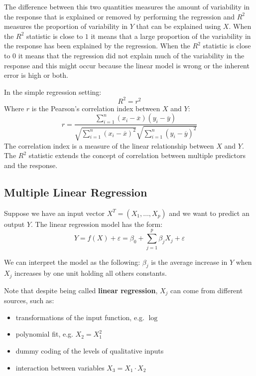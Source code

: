 The difference between this two quantities measures the amount of variability in the response that is explained or removed by performing the regression and $R^2$ measures the proportion of variability in $Y$ that can be explained using $X$.
When the $R^2$ statistic is close to $1$ it means that a large proportion of the variability in the response has been explained by the regression.
When the $R^2$ statistic is close to $0$ it means that the regression did not explain much of the variability in the response and this might occur because the linear model is wrong or the inherent error is high or both.

In the simple regression setting:
\[
    R^2 = r^2
\]
Where $r$ is the Pearson's correlation index between $X$ and $Y$:
\[
    r = \frac{\sum_{i=1}^{n} (x_i - \overline{x})(y_i - \overline{y})}{\sqrt{\sum_{i=1}^{n} (x_i - \overline{x})^2} \sqrt{\sum_{i=1}^{n} (y_i - \overline{y})^2}}
\]
The correlation index is a measure of the linear relationship between $X$ and $Y$. The $R^2$ statistic extends the concept of correlation between multiple predictors and the response.

\subsection{Multiple Linear Regression}
Suppose we have an input vector $X^T = (X_1, \dots, X_p)$ and we want to predict an output $Y$. The linear regression model has the form:
\[
    Y = f(X) + \varepsilon = \beta_0 + \sum_{j=1}^{p} \beta_j X_j + \varepsilon
\]

We can interpret the model as the following: $\beta_j$ is the average increase in $Y$ when $X_j$ increases by one unit holding all others constants.

Note that despite being called \textbf{linear regression}, $X_j$ can come from different sources, such as:
\begin{itemize}
    \item transformations of the input function, e.g. $\log$
    \item polynomial fit, e.g. $X_2 = X_1^2$
    \item dummy coding of the levels of qualitative inputs
    \item interaction between variables $X_3 = X_1 \cdot X_2$
\end{itemize}


